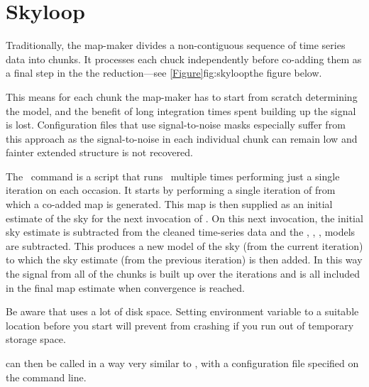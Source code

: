 \section{Skyloop}
\label{sec:skyloop}


Traditionally, the map-maker divides a non-contiguous sequence of time
series data into chunks. It processes each chuck independently
before co-adding them as a final step in the the reduction---see
\cref{Figure}{fig:skyloop}{the figure below}.

This means for each chunk the map-maker has to start from scratch
determining the  model, and the benefit of long integration
times spent building up the signal is lost. Configuration files that use
signal-to-noise masks especially suffer from this approach as the
signal-to-noise in each individual chunk can remain low and fainter
extended structure is not recovered.

The \skyloop\ command is a script that runs \makemap\ multiple times
performing just a single iteration on each occasion. It starts by
performing a single iteration of  from which a
co-added map is generated. This map is then supplied as an initial
estimate of the sky for the next invocation of . On
this next invocation, the initial sky estimate is subtracted from the
cleaned time-series data and the , ,
,  models are subtracted. This produces a new
model of the sky (from the current iteration) to which the sky
estimate (from the previous iteration) is then added. In this way the
signal from all of the chunks is built up over the iterations and is
all included in the final map estimate when convergence is reached.




Be aware that  uses a lot of disk space. Setting
environment variable  to a suitable location
before you start will prevent  from crashing
if you run out of temporary storage space.
\begin{terminalv}
\end{terminalv}
 can then be called in a way very similar to \makemap, with
a configuration file specified on the command line.
\begin{terminalv}
\end{terminalv}

